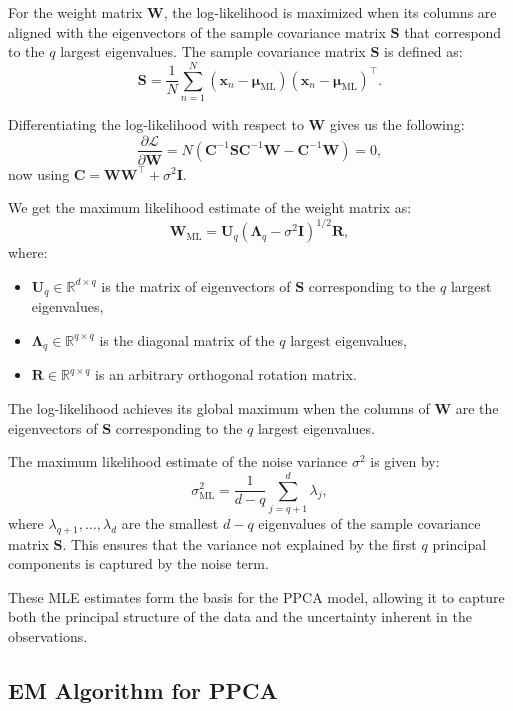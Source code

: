\documentclass{article}
\begin{document}
For the weight matrix \(\mathbf{W}\), the log-likelihood is maximized when its columns are aligned with the eigenvectors of the sample covariance matrix \(\mathbf{S}\) that correspond to the \(q\) largest eigenvalues. The sample covariance matrix \(\mathbf{S}\) is defined as:
\[
\mathbf{S} = \frac{1}{N} \sum_{n=1}^N (\mathbf{x}_n - \boldsymbol{\mu}_{\text{ML}})(\mathbf{x}_n - \boldsymbol{\mu}_{\text{ML}})^\top.
\]


Differentiating the log-likelihood with respect to \(\mathbf{W}\) gives us the following:
\[
\frac{\partial \mathcal{L}}{\partial \mathbf{W}} = N(\mathbf{C}^{-1} \mathbf{S}\mathbf{C}^{-1}\mathbf{W}  - \mathbf{C}^{-1} \mathbf{W}) = 0,
\]
now using $\mathbf{C} = \mathbf{W} \mathbf{W}^\top + \sigma^2 \mathbf{I}.$

We get the maximum likelihood estimate of the weight matrix as:
\[
\mathbf{W}_{\text{ML}} = \mathbf{U}_q (\mathbf{\Lambda}_q - \sigma^2 \mathbf{I})^{1/2} \mathbf{R},
\]
where:
\begin{itemize}
    \item \(\mathbf{U}_q \in \mathbb{R}^{d \times q}\) is the matrix of eigenvectors of \(\mathbf{S}\) corresponding to the \(q\) largest eigenvalues,
    \item \(\mathbf{\Lambda}_q \in \mathbb{R}^{q \times q}\) is the diagonal matrix of the \(q\) largest eigenvalues,
    \item \(\mathbf{R} \in \mathbb{R}^{q \times q}\) is an arbitrary orthogonal rotation matrix.
\end{itemize}

The log-likelihood achieves its global maximum when the columns of \(\mathbf{W}\) are the eigenvectors of \(\mathbf{S}\) corresponding to the \(q\) largest eigenvalues.

The maximum likelihood estimate of the noise variance \(\sigma^2\) is given by:
\[
\sigma^2_{\text{ML}} = \frac{1}{d - q} \sum_{j=q+1}^d \lambda_j,
\]
where \(\lambda_{q+1}, \ldots, \lambda_d\) are the smallest \(d - q\) eigenvalues of the sample covariance matrix \(\mathbf{S}\). This ensures that the variance not explained by the first \(q\) principal components is captured by the noise term.

These MLE estimates form the basis for the PPCA model, allowing it to capture both the principal structure of the data and the uncertainty inherent in the observations.

\subsection{EM Algorithm for PPCA}
\end{document}
